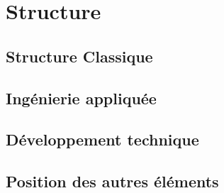 \chapter{Structure}

\section{Structure Classique}


\section{Ingénierie appliquée}


\section{Développement technique}

\section{Position des autres éléments}
